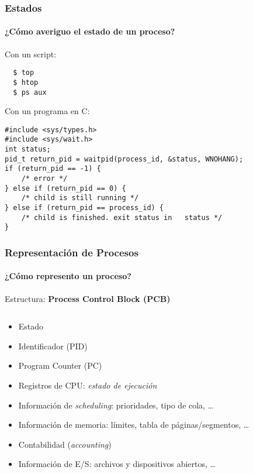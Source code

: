 \documentclass[letter]{beamer}
\begin{document}
\begin{frame}[fragile]
  \frametitle{Estados}
  \framesubtitle{¿Cómo averiguo el estado de un proceso?}

  Con un script:
  \begin{verbatim}
  $ top
  $ htop
  $ ps aux
  \end{verbatim}

  Con un programa en C:
  \begin{verbatim}
#include <sys/types.h>
#include <sys/wait.h>
int status;
pid_t return_pid = waitpid(process_id, &status, WNOHANG);
if (return_pid == -1) {
    /* error */
} else if (return_pid == 0) {
    /* child is still running */
} else if (return_pid == process_id) {
    /* child is finished. exit status in   status */
}
\end{verbatim}

  

\end{frame}
\begin{frame}
  \frametitle{Representación de Procesos}
  \framesubtitle{¿Cómo represento un proceso?}
  
  Estructura: {\bf Process Control Block (PCB)}

  \begin{columns}[c]
    \begin{column}[T]{8.5cm}
      \begin{itemize}
        \item<3-> Estado
        \item<4-> Identificador (PID)
        \item<5-> Program Counter (PC)
        \item<6-> Registros de CPU: {\em estado de ejecución}
        \item<7-> Información de {\em scheduling}: prioridades, tipo de cola, \ldots
        \item<8-> Información de memoria: límites, tabla de páginas/segmentos, \ldots
        \item<9-> Contabilidad ({\em accounting})
        \item<9-> Información de E/S: archivos y dispositivos abiertos, \ldots
      \end{itemize}
    \end{column}
    
    \begin{column}[T]{3cm}
    \end{column}
  \end{columns}

  
\end{frame}
\end{document}

